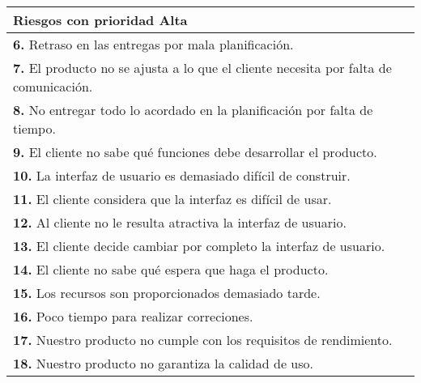 \documentclass[spanish,a4paper,12pt]{report}	%
\begin{document}
			\begin{tabular}{|p{12cm}|}
				\hline
				\textbf{Riesgos con prioridad Alta}\\ \hline \hline
				\textbf{6.} Retraso en las entregas por mala planificación.\\ \hline 
				\textbf{7.} El producto no se ajusta a lo que el cliente necesita por falta de comunicación. \\ \hline
				\textbf{8.}  No entregar todo lo acordado en la planificación por falta de tiempo.\\ \hline
				\textbf{9.} El cliente no sabe qué funciones debe desarrollar el producto. \\ \hline
				\textbf{10.} La interfaz de usuario es demasiado difícil de construir. \\ \hline
				\textbf{11.} El cliente considera que la interfaz es difícil de usar.		\\ \hline
				\textbf{12.} Al cliente no le resulta atractiva la interfaz de usuario.			\\ \hline
				\textbf{13.} El cliente decide cambiar por completo la interfaz de usuario.			\\ \hline
				\textbf{14.} El cliente no sabe qué espera que haga el producto.			\\ \hline
				\textbf{15. }Los recursos son proporcionados demasiado tarde. 				\\ \hline
				\textbf{16. }Poco tiempo para realizar correciones. \\ \hline
				\textbf{17. }Nuestro producto no cumple con los requisitos de rendimiento. \\ \hline
				\textbf{18. }Nuestro producto no garantiza la calidad de uso. \\ \hline
		
			\end{tabular}
				\ \\
				\ \\
			
\end{document}
